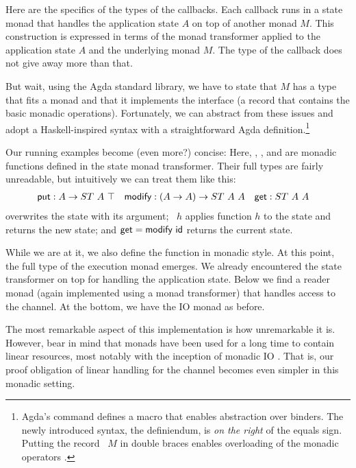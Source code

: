 \documentclass[acmsmall,review,anonymous,screen]{acmart}
\begin{document}
\mstCommand

Here are the specifics of the types of the callbacks. Each callback
runs in a state monad that handles the application state $A$ on top of
another monad $M$. This construction is expressed in terms of the
monad transformer {\AStateT} applied to the application state
$A$ and the underlying monad $M$. The type of the callback does not give away more
than that.

But wait, using the Agda standard library, we have to state that $M$
has a type that fits a monad and that it implements the
interface {\ARawMonad} (a record that contains the basic monadic
operations).
Fortunately, we can abstract from these issues and adopt a
Haskell-inspired syntax with a straightforward
Agda definition.\footnote{Agda's  command defines
  a macro that enables abstraction over binders. The newly introduced
  syntax, the definiendum, is \emph{on the right} of the equals
  sign. Putting the record {\ARawMonad~$M$} in double braces enables overloading of the
  monadic operators \cite{DBLP:conf/icfp/DevrieseP11}.}
\mstMonadic

Our running examples become (even more?) concise:
\mstExampleServers
Here, {\Aput}, {\Amodify}, and {\Aget} are monadic functions defined
in the state monad transformer. Their full types are fairly
unreadable, but intuitively we can treat them like this:
\begin{align*}
  \Aput &: A \to ST~A~\top
  & \Amodify &: (A \to A)\to ST~A~A
  & \Aget &: ST~A~A
\end{align*}
{\Aput} overwrites the state with its argument; {\Amodify~$h$} applies 
function $h$ to the state and returns the new state; and {$\Aget = \Amodify~\Aid$} returns the current state.

While we are at it, we also define the {\Aexecutor} function in
monadic style. At this point, the full type of the execution monad
emerges. We already encountered the state transformer on top for
handling the application state. Below we find a reader monad (again
implemented using a monad transformer) that handles access to the
channel. At the bottom, we have the IO monad as before.
\mstExecutor

The most remarkable aspect of this implementation is how unremarkable
it is. However, bear in mind that monads have been used for a long
time to contain linear resources, most notably with the inception of
monadic IO \cite{DBLP:conf/popl/JonesW93}. That is, our proof
obligation of linear handling for the channel becomes even simpler in
this monadic setting.
\end{document}
